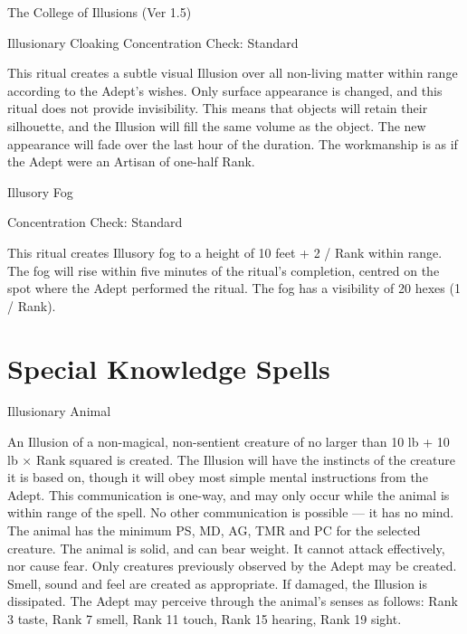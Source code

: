 \begin{Chapter}{The College of Illusions (Ver 1.5)}
\begin{ritual}[Q-1]{Illusionary Cloaking}
Concentration Check: Standard 
\begin{effects}
This ritual creates a subtle visual Illusion over all non-living
matter within range according to the Adept’s wishes.  Only surface
appearance is changed, and this ritual does not provide invisibility.
This means that objects will retain their silhouette, and the Illusion
will fill the same volume as the object.  The new appearance will fade
over the last hour of the duration. The workmanship is as if the Adept
were an Artisan of one-half Rank.
\end{effects}
\end{ritual}

\begin{ritual}[Q-2]{Illusory Fog}

Concentration Check: Standard 
\begin{effects}
This ritual creates Illusory fog to a height of 10 feet + 2 / Rank
within range.  The fog will rise within five minutes of the ritual’s
completion, centred on the spot where the Adept performed the ritual.
The fog has a visibility of 20 hexes (1 / Rank).
\end{effects}
\end{ritual}

\section{Special Knowledge Spells}

\begin{spell}[S-1]{Illusionary Animal}


\begin{effects}
An Illusion of a non-magical, non-sentient creature of no larger than
10 lb + 10 lb × Rank squared is created.  The Illusion will have the
instincts of the creature it is based on, though it will obey most
simple mental instructions from the Adept.  This communication is
one-way, and may only occur while the animal is within range of the
spell. No other communication is possible — it has no mind.  The
animal has the minimum PS, MD, AG, TMR and PC for the selected
creature.  The animal is solid, and can bear weight.  It cannot attack
effectively, nor cause fear.  Only creatures previously observed by
the Adept may be created.  Smell, sound and feel are created as
appropriate. If damaged, the Illusion is dissipated. The Adept may
perceive through the animal’s senses as follows: Rank 3 taste, Rank 7
smell, Rank 11 touch, Rank 15 hearing, Rank 19 sight.
\end{effects}
\end{spell}


\end{Chapter}
